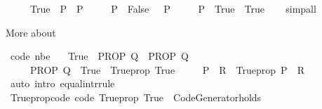 \begin{isabellebody}
\ \ \ \ \ {\isachardoublequoteopen}{\isacharparenleft}{\kern0pt}True\ {\isasymlongrightarrow}\ P{\isacharparenright}{\kern0pt}\ {\isasymlongleftrightarrow}\ P{\isachardoublequoteclose}\isanewline
\ \ \ \ \ {\isachardoublequoteopen}{\isacharparenleft}{\kern0pt}P\ {\isasymlongrightarrow}\ False{\isacharparenright}{\kern0pt}\ {\isasymlongleftrightarrow}\ {\isasymnot}\ P{\isachardoublequoteclose}\isanewline
\ \ \ \ \ {\isachardoublequoteopen}{\isacharparenleft}{\kern0pt}P\ {\isasymlongrightarrow}\ True{\isacharparenright}{\kern0pt}\ {\isasymlongleftrightarrow}\ True{\isachardoublequoteclose}\isanewline
%
\isadelimproof
\ \ %
\endisadelimproof
%
\isatagproof
{}\isamarkupfalse%
\ simp{\isacharunderscore}{\kern0pt}all%
\endisatagproof
{\isafoldproof}%
%
\isadelimproof
%
\endisadelimproof
%
\begin{isamarkuptext}%
More about %
\end{isamarkuptext}\isamarkuptrue%
\isamarkupfalse%
\ {\isacharbrackleft}{\kern0pt}code\ nbe{\isacharbrackright}{\kern0pt}{\isacharcolon}{\kern0pt}\isanewline
\ \ \ {\isachardoublequoteopen}{\isacharparenleft}{\kern0pt}True\ {\isasymLongrightarrow}\ PROP\ Q{\isacharparenright}{\kern0pt}\ {\isasymequiv}\ PROP\ Q{\isachardoublequoteclose}\isanewline
\ \ \ \ \ {\isachardoublequoteopen}{\isacharparenleft}{\kern0pt}PROP\ Q\ {\isasymLongrightarrow}\ True{\isacharparenright}{\kern0pt}\ {\isasymequiv}\ Trueprop\ True{\isachardoublequoteclose}\isanewline
\ \ \ \ \ {\isachardoublequoteopen}{\isacharparenleft}{\kern0pt}P\ {\isasymLongrightarrow}\ R{\isacharparenright}{\kern0pt}\ {\isasymequiv}\ Trueprop\ {\isacharparenleft}{\kern0pt}P\ {\isasymlongrightarrow}\ R{\isacharparenright}{\kern0pt}{\isachardoublequoteclose}\isanewline
%
\isadelimproof
\ \ %
\endisadelimproof
%
\isatagproof
{}\isamarkupfalse%
\ {\isacharparenleft}{\kern0pt}auto\ intro{\isacharbang}{\kern0pt}{\isacharcolon}{\kern0pt}\ equal{\isacharunderscore}{\kern0pt}intr{\isacharunderscore}{\kern0pt}rule{\isacharparenright}{\kern0pt}%
\endisatagproof
{\isafoldproof}%
%
\isadelimproof
\isanewline
%
\endisadelimproof
\isanewline
{}\isamarkupfalse%
\ Trueprop{\isacharunderscore}{\kern0pt}code\ {\isacharbrackleft}{\kern0pt}code{\isacharbrackright}{\kern0pt}{\isacharcolon}{\kern0pt}\ {\isachardoublequoteopen}Trueprop\ True\ {\isasymequiv}\ Code{\isacharunderscore}{\kern0pt}Generator{\isachardot}{\kern0pt}holds{\isachardoublequoteclose}\isanewline
%
\isadelimproof

\end{isabellebody}
